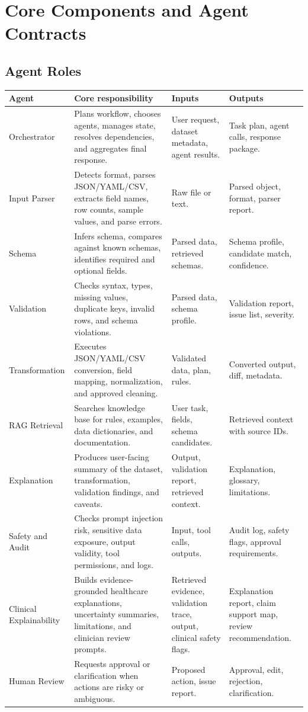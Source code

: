 \section{Core Components and Agent Contracts}

\subsection{Agent Roles}

\begin{longtable}{p{}p{}p{}p{}}
\toprule
\textbf{Agent} & \textbf{Core responsibility} & \textbf{Inputs} & \textbf{Outputs} \\
\midrule
Orchestrator & Plans workflow, chooses agents, manages state, resolves dependencies, and aggregates final response. & User request, dataset metadata, agent results. & Task plan, agent calls, response package. \\
\addlinespace
Input Parser & Detects format, parses JSON/YAML/CSV, extracts field names, row counts, sample values, and parse errors. & Raw file or text. & Parsed object, format, parser report. \\
\addlinespace
Schema & Infers schema, compares against known schemas, identifies required and optional fields. & Parsed data, retrieved schemas. & Schema profile, candidate match, confidence. \\
\addlinespace
Validation & Checks syntax, types, missing values, duplicate keys, invalid rows, and schema violations. & Parsed data, schema profile. & Validation report, issue list, severity. \\
\addlinespace
Transformation & Executes JSON/YAML/CSV conversion, field mapping, normalization, and approved cleaning. & Validated data, plan, rules. & Converted output, diff, metadata. \\
\addlinespace
RAG Retrieval & Searches knowledge base for rules, examples, data dictionaries, and documentation. & User task, fields, schema candidates. & Retrieved context with source IDs. \\
\addlinespace
Explanation & Produces user-facing summary of the dataset, transformation, validation findings, and caveats. & Output, validation report, retrieved context. & Explanation, glossary, limitations. \\
\addlinespace
Safety and Audit & Checks prompt injection risk, sensitive data exposure, output validity, tool permissions, and logs. & Input, tool calls, outputs. & Audit log, safety flags, approval requirements. \\
\addlinespace
Clinical Explainability & Builds evidence-grounded healthcare explanations, uncertainty summaries, limitations, and clinician review prompts. & Retrieved evidence, validation trace, output, clinical safety flags. & Explanation report, claim support map, review recommendation. \\
\addlinespace
Human Review & Requests approval or clarification when actions are risky or ambiguous. & Proposed action, issue report. & Approval, edit, rejection, clarification. \\
\bottomrule
\end{longtable}

